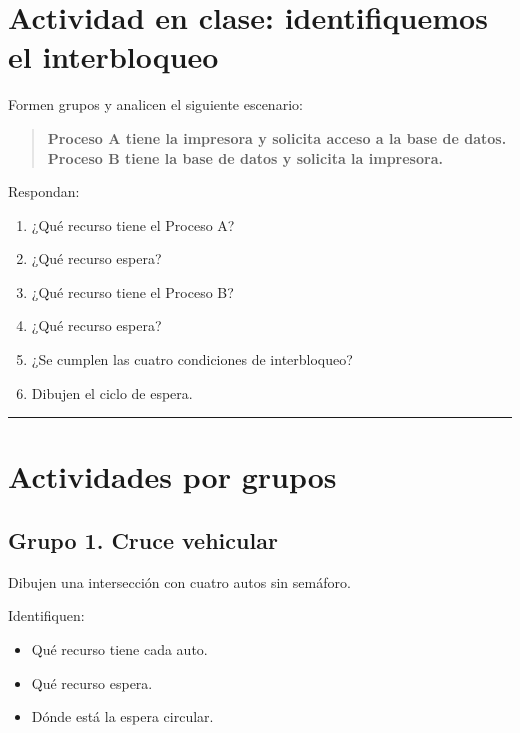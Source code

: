 \documentclass[
  spanish,
  letterpaper,
]{scrbook}
\providecommand{\tightlist}{%
  \setlength{\itemsep}{0pt}\setlength{\parskip}{0pt}}
\begin{document}
\chapter{Actividad en clase: identifiquemos el
interbloqueo}\label{actividad-en-clase-identifiquemos-el-interbloqueo}

Formen grupos y analicen el siguiente escenario:

\begin{quote}
\textbf{Proceso A tiene la impresora y solicita acceso a la base de
datos.\\
Proceso B tiene la base de datos y solicita la impresora.}
\end{quote}

Respondan:

\begin{enumerate}
\def\labelenumi{\arabic{enumi}.}
\tightlist
\item
  ¿Qué recurso tiene el Proceso A?
\item
  ¿Qué recurso espera?
\item
  ¿Qué recurso tiene el Proceso B?
\item
  ¿Qué recurso espera?
\item
  ¿Se cumplen las cuatro condiciones de interbloqueo?
\item
  Dibujen el ciclo de espera.
\end{enumerate}

\begin{center}\rule{0.5\linewidth}{0.5pt}\end{center}


\chapter{Actividades por grupos}\label{actividades-por-grupos}

\section{Grupo 1. Cruce vehicular}\label{grupo-1.-cruce-vehicular}

Dibujen una intersección con cuatro autos sin semáforo.

Identifiquen:

\begin{itemize}
\tightlist
\item
  Qué recurso tiene cada auto.
\item
  Qué recurso espera.
\item
  Dónde está la espera circular.
\end{itemize}
\end{document}
